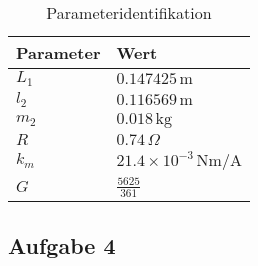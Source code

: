 \begin{table}[h]
	\centering
	\begin{tabular}{l|l}
		\textbf{Parameter} & \textbf{Wert}                        \\ \hline
		$L_1$               & $0.147425 \, \text{m}$               \\
		$l_2 $              & $0.116569 \, \text{m}$               \\
		$m_2$               & $0.018 \, \text{kg}$                 \\
		$R $               & $0.74 \, \Omega$                     \\
		$k_{m}$            & $21.4 \times 10^{-3} \, \text{Nm/A}$ \\
		$G$                & $\frac{5625}{361}$
	\end{tabular}
	\caption{Parameteridentifikation}
	\label{tab:parameter_modell}
\end{table}


\subsection{Aufgabe 4}










